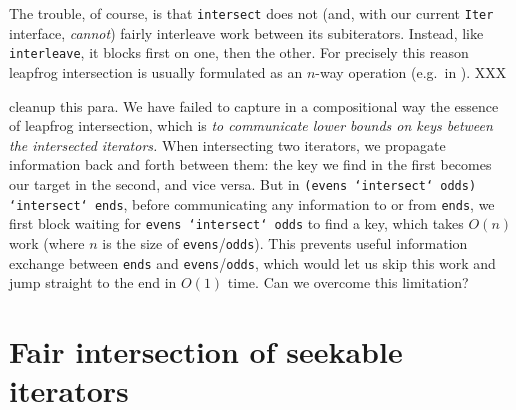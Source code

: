 \documentclass[acmsmall,screen,review,anonymous,dvipsnames,svgnames]{acmart}
\newcommand\hask[1]{\texttt{#1}}
\newcommand\ttt\texttt
\newcommand\todo[1]{{\color{Orange}#1}}
\newcommand\XXX{\todo{XXX}}
\begin{document}
The trouble, of course, is that \ttt{intersect} does not (and, with our current \hask{Iter} interface, \emph{cannot}) fairly interleave work between its subiterators.
Instead, like \ttt{interleave}, it blocks first on one, then the other.
For precisely this reason leapfrog intersection is usually formulated as an $n$-way operation (e.g.\ in \citet{lftj}). \XXX

\todo{cleanup this para.}
We have failed to capture in a compositional way the essence of leapfrog intersection, which is \emph{to communicate lower bounds on keys between the intersected iterators.}
When intersecting two iterators, we propagate information back and forth between them: the key we find in the first becomes our target in the second, and vice versa.
But in \ttt{(evens `intersect` odds) `intersect` ends}, before communicating any information to or from \ttt{ends}, we first block waiting for \ttt{evens `intersect` odds} to find a key, which takes $O(n)$ work (where $n$ is the size of \ttt{evens}/\ttt{odds}).
This prevents useful information exchange between \ttt{ends} and \ttt{evens}/\ttt{odds}, which would let us skip this work and jump straight to the end in $O(1)$ time.
\noindent
\todo{Can we overcome this limitation?}






\section{Fair intersection of seekable iterators}
\end{document}
